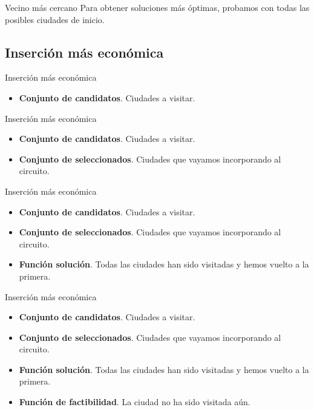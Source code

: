 \documentclass{beamer}
\begin{document}
\begin{frame}[fragile]{Vecino más cercano}
Para obtener soluciones más óptimas, probamos con todas las posibles ciudades de inicio.
\end{frame}

\subsection{Inserción más económica}

\begin{frame}[fragile]{Inserción más económica}

\begin{itemize}
	\item \textbf{Conjunto de candidatos}. Ciudades a visitar.
\end{itemize}

\end{frame}

\begin{frame}[fragile]{Inserción más económica}

\begin{itemize}
	\item \textbf{Conjunto de candidatos}. Ciudades a visitar.
	\item \textbf{Conjunto de seleccionados}. Ciudades que vayamos incorporando al circuito.
\end{itemize}

\end{frame}

\begin{frame}[fragile]{Inserción más económica}

\begin{itemize}
	\item \textbf{Conjunto de candidatos}. Ciudades a visitar.
	\item \textbf{Conjunto de seleccionados}. Ciudades que vayamos incorporando al circuito.
	\item \textbf{Función solución}. Todas las ciudades han sido visitadas y hemos vuelto a la primera.
\end{itemize}

\end{frame}

\begin{frame}[fragile]{Inserción más económica}

\begin{itemize}
	\item \textbf{Conjunto de candidatos}. Ciudades a visitar.
	\item \textbf{Conjunto de seleccionados}. Ciudades que vayamos incorporando al circuito.
	\item \textbf{Función solución}. Todas las ciudades han sido visitadas y hemos vuelto a la primera.
	\item \textbf{Función de factibilidad}. La ciudad no ha sido visitada aún.
\end{itemize}

\end{frame}
\end{document}
